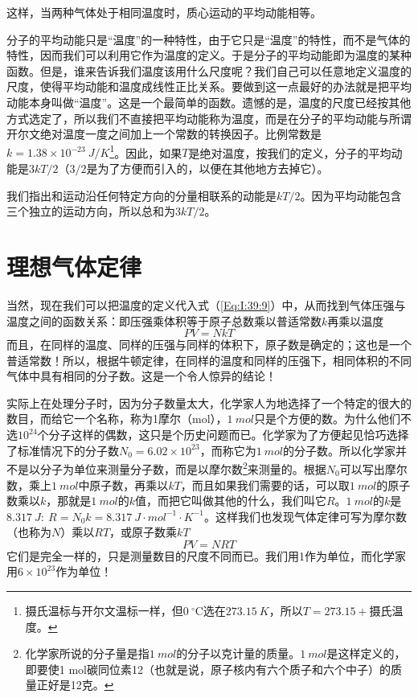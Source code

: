 这样，当两种气体处于相同温度时，质心运动的平均动能相等。

分子的平均动能只是“温度”的一种特性，由于它只是“温度”的特性，而不是气体的特性，因而我们可以利用它作为温度的定义。于是分子的平均动能即为温度的某种函数。但是，谁来告诉我们温度该用什么尺度呢？我们自己可以任意地定义温度的尺度，使得平均动能和温度成线性正比关系。要做到这一点最好的办法就是把平均动能本身叫做“温度”。这是一个最简单的函数。遗憾的是，温度的尺度已经按其他方式选定了，所以我们不直接把平均动能称为温度，而是在分子的平均动能与所谓开尔文绝对温度一度之间加上一个常数的转换因子。比例常数是$k=1.38\times 10^{-23}~J/K$\footnote{摄氏温标与开尔文温标一样，但$0~^\circ\text{C}$选在$273.15~K$，所以$T=273.15+$摄氏温度。}。因此，如果$T$是绝对温度，按我们的定义，分子的平均动能是$3kT/2$（$3/2$是为了方便而引入的，以便在其他地方去掉它）。

我们指出和运动沿任何特定方向的分量相联系的动能是$kT/2$。因为平均动能包含三个独立的运动方向，所以总和为$3kT/2$。

\section{理想气体定律}

当然，现在我们可以把温度的定义代入式（\ref{Eq:I:39:9}）中，从而找到气体压强与温度之间的函数关系：即压强乘体积等于原子总数乘以普适常数$k$再乘以温度
\begin{equation}
    \label{Eq:I:39:22}
    PV = NkT
\end{equation}
而且，在同样的温度、同样的压强与同样的体积下，原子数是确定的；这也是一个普适常数！所以，根据牛顿定律，在同样的温度和同样的压强下，相同体积的不同气体中具有相同的分子数。这是一个令人惊异的结论！

实际上在处理分子时，因为分子数量太大，化学家人为地选择了一个特定的很大的数目，而给它一个名称，称为1摩尔（mol），$1~mol$只是个方便的数。为什么他们不选$10^24$个分子这样的偶数，这只是个历史问题而已。化学家为了方便起见恰巧选择了标准情况下的分子数$N_0=6.02\times 10^{23}$，而称它为$1~mol$的分子数。所以化学家并不是以分子为单位来测量分子数，而是以摩尔数\footnote{化学家所说的分子量是指$1~mol$的分子以克计量的质量。$1~mol$是这样定义的，即要使1 mol碳同位素12（也就是说，原子核内有六个质子和六个中子）的质量正好是12克。}来测量的。根据$N_0$可以写出摩尔数，乘上$1~mol$中原子数，再乘以$kT$，而且如果我们需要的话，可以取$1~mol$的原子数乘以$k$，那就是$1~mol$的$k$值，而把它叫做其他的什么，我们叫它$R$。$1~mol$的$k$是$8.317~J:~R=N_0k=8.317~J\cdot mol^{-1}\cdot K^{-1}$。这样我们也发现气体定律可写为摩尔数（也称为$N$）乘以$RT$，或原子数乘$kT$
\begin{equation}
    \label{Eq:I:39:23}
    PV = NRT
\end{equation}
它们是完全一样的，只是测量数目的尺度不同而已。我们用1作为单位，而化学家用$6\times 10^{23}$作为单位！

